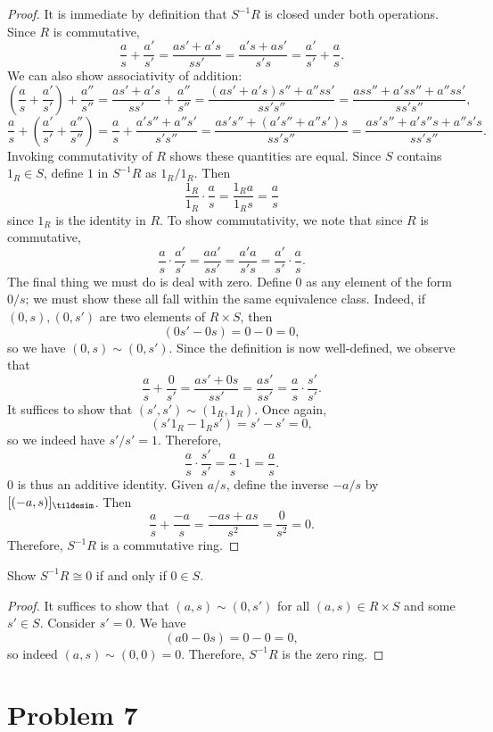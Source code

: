 \documentclass[11pt, letterpaper]{article}
\begin{document}
\begin{proof}
	It is immediate by definition that $S^{-1} R$ is closed under both operations. Since $R$ is commutative,
	\[
		\frac{a}{s} +\frac{a'}{s'} =\frac{as'+a's}{ss'} =\frac{a's+as'}{s's} =\frac{a'}{s'} +\frac{a}{s} 
	.\]
	We can also show associativity of addition:
	\[
		\left( \frac{a}{s} +\frac{a'}{s'}  \right) +\frac{a''}{s''} =\frac{as'+a's}{ss'} +\frac{a''}{s''} =\frac{\left( as'+a's \right) s''+a''ss'}{ss's''} =\frac{ass''+a'ss''+a''ss'}{ss's''} ,
	\]
	\[
		\frac{a}{s} +\left( \frac{a'}{s'} +\frac{a''}{s''}  \right) =\frac{a}{s} +\frac{a's''+a''s'}{s's''} =\frac{as's''+\left( a's''+a''s' \right) s}{ss's''} =\frac{as's''+a's''s+a''s's}{ss's''} 
	.\]
	Invoking commutativity of $R$ shows these quantities are equal. Since $S$ contains $1_R\in S$, define $1$ in $S^{-1} R$ as $1_R/1_R$. Then
	\[
		\frac{1_R}{1_R} \cdot \frac{a}{s} =\frac{1_Ra}{1_Rs} =\frac{a}{s} 
	\]
	since $1_R $ is the identity in $R$. To show commutativity, we note that since $R$ is commutative,
	\[
		\frac{a}{s} \cdot \frac{a'}{s'} =\frac{aa'}{ss'} =\frac{a'a}{s's} =\frac{a'}{s'} \cdot \frac{a}{s} 
	.\]
	The final thing we must do is deal with zero. Define $0$ as any element of the form $0/s$; we must show these all fall within the same equivalence class. Indeed, if $(0,s),(0,s')$ are two elements of $R\times S$, then
	\[
		(0s'-0s)=0-0=0,
	\]
	so we have $(0,s)\sim (0,s')$. Since the definition is now well-defined, we observe that
	\[
		\frac{a}{s} +\frac{0}{s'} = \frac{as'+0s}{ss'} =\frac{as'}{ss'} =\frac{a}{s} \cdot \frac{s'}{s'} 
	.\]
	It suffices to show that $(s',s')\sim (1_R,1_R)$. Once again,
	\[
		(s'1_R-1_Rs')=s'-s'=0
	,\]
	so we indeed have $s'/s'=1$. Therefore,
	\[
		\frac{a}{s} \cdot \frac{s'}{s'} =\frac{a}{s} \cdot 1=\frac{a}{s} 
	.\]
	0 is thus an additive identity. Given $a/s$, define the inverse $-a/s$ by $[(-a,s)]_{\tildesim}$. Then
	\[
		\frac{a}{s} +\frac{-a}{s} = \frac{-as + as}{s^2} =\frac{0}{s^2} =0
	.\]
	Therefore, $S^{-1} R$ is a commutative ring.
\end{proof}

\begin{problem}
	Show $S^{-1} R\cong 0$ if and only if $0\in S$.
\end{problem}
\begin{proof}
	It suffices to show that $(a,s)\sim (0,s')$ for all $(a,s)\in R\times S$ and some $s'\in S$. Consider $s'=0$. We have
	\[
		(a0-0s)=0-0=0,
	\]
	so indeed $(a,s)\sim (0,0)=0$. Therefore, $S^{-1} R$ is the zero ring.
\end{proof}


\section{Problem 7}
\end{document}
